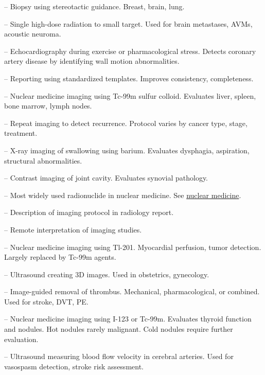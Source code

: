 -- Biopsy using stereotactic guidance. Breast, brain, lung.

-- Single high-dose radiation to small target. Used for brain metastases, AVMs, acoustic neuroma.

-- Echocardiography during exercise or pharmacological stress. Detects coronary artery disease by identifying wall motion abnormalities.

-- Reporting using standardized templates. Improves consistency, completeness.

-- Nuclear medicine imaging using Tc-99m sulfur colloid. Evaluates liver, spleen, bone marrow, lymph nodes.

-- Repeat imaging to detect recurrence. Protocol varies by cancer type, stage, treatment.

-- X-ray imaging of swallowing using barium. Evaluates dysphagia, aspiration, structural abnormalities.

-- Contrast imaging of joint cavity. Evaluates synovial pathology.

-- Most widely used radionuclide in nuclear medicine. See \hyperlink{Nuclear Medicine}{nuclear medicine}.

-- Description of imaging protocol in radiology report.

-- Remote interpretation of imaging studies.

-- Nuclear medicine imaging using Tl-201. Myocardial perfusion, tumor detection. Largely replaced by Tc-99m agents.

-- Ultrasound creating 3D images. Used in obstetrics, gynecology.

-- Image-guided removal of thrombus. Mechanical, pharmacological, or combined. Used for stroke, DVT, PE.

-- Nuclear medicine imaging using I-123 or Tc-99m. Evaluates thyroid function and nodules. Hot nodules rarely malignant. Cold nodules require further evaluation.

-- Ultrasound measuring blood flow velocity in cerebral arteries. Used for vasospasm detection, stroke risk assessment.

